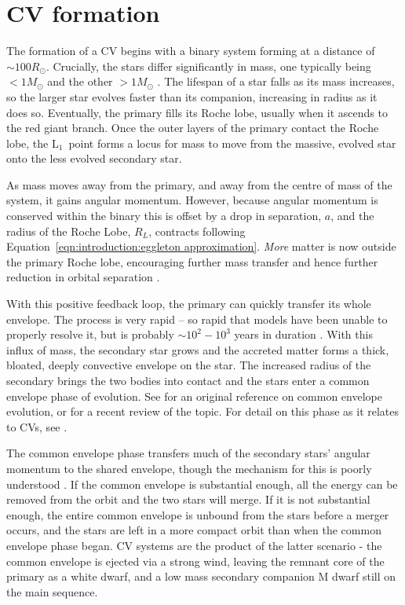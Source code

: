 \section{CV formation}
\label{sect:introduction:formation of CVs}

The formation of a CV begins with a binary system forming at a distance of $\sim 100{R_\odot}$. Crucially, the stars differ significantly in mass, one typically being $<1{M_\odot}$ and the other $>1{M_\odot}$ \citep{Ritter2012}. The lifespan of a star falls as its mass increases, so the larger star evolves faster than its companion, increasing in radius as it does so. Eventually, the primary fills its Roche lobe, usually when it ascends to the red giant branch. 
Once the outer layers of the primary contact the Roche lobe, the $\mathrm L_1$\ point forms a locus for mass to move from the massive, evolved star onto the less evolved secondary star.

As mass moves away from the primary, and away from the centre of mass of the system, it gains angular momentum. However, because angular momentum is conserved within the binary this is offset by a drop in separation, $a$, and the radius of the Roche Lobe, ${R_L}$, contracts following Equation~\ref{eqn:introduction:eggleton approximation}. \textit{More} matter is now outside the primary Roche lobe, encouraging further mass transfer and hence further reduction in orbital separation \citep{Ritter2008}.

With this positive feedback loop, the primary can quickly transfer its whole envelope. The process is very rapid -- so rapid that models have been unable to properly resolve it, but is probably $\sim 10^2 - 10^3$ years in duration \citep{Ritter2012}. With this influx of mass, the secondary star grows and the accreted matter forms a thick, bloated, deeply convective envelope on the star. The increased radius of the secondary brings the two bodies into contact \citep{Ritter2008} and the stars enter a common envelope phase of evolution. See \citet{paczynski1976} for an original reference on common envelope evolution, or \citet{ivanova2020} for a recent review of the topic. For detail on this phase as it relates to CVs, see \citet{taam1978, webbink1984, zorotovic2010, passy2011}.

The common envelope phase transfers much of the secondary stars' angular momentum to the shared envelope, though the mechanism for this is poorly understood \citep{demarco2011}. 
If the common envelope is substantial enough, all the energy can be removed from the orbit and the two stars will merge. 
If it is not substantial enough, the entire common envelope is unbound from the stars before a merger occurs, and the stars are left in a more compact orbit than when the common envelope phase began.
CV systems are the product of the latter scenario - the common envelope is ejected via a strong wind, leaving the remnant core of the primary as a white dwarf, and a low mass secondary companion M dwarf still on the main sequence. 

